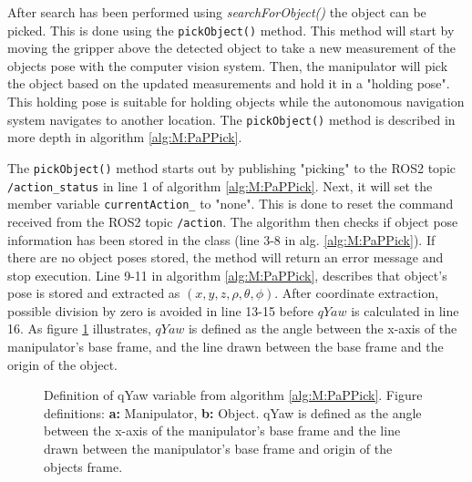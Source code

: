 


After search has been performed using \textit{searchForObject()} the object can be picked. This is done using the \lstinline{pickObject()}  method. This method will start by moving the gripper above the detected object to take a new measurement of the objects pose with the computer vision system. Then, the manipulator will pick the object based on the updated measurements and hold it in a "holding pose". This holding pose is suitable for holding objects while the autonomous navigation system navigates to another location. The \lstinline{pickObject()}  method is described in more depth in algorithm \ref{alg:M:PaPPick}. 



The \lstinline{pickObject()} method starts out by publishing "picking" to the ROS2 topic \lstinline{/action_status} in line 1 of algorithm \ref{alg:M:PaPPick}. Next, it will set the member variable \lstinline{currentAction_} to "none". This is done to reset the command received from the ROS2 topic \lstinline{/action}. The algorithm then checks if object pose information has been stored in the class (line 3-8 in alg. \ref{alg:M:PaPPick}). If there are no object poses stored, the method will return an error message and stop execution. Line 9-11 in algorithm \ref{alg:M:PaPPick}, describes that object's pose is stored and extracted as $(x,y,z,\rho,\theta,\phi)$. After coordinate extraction, possible division by zero is avoided in line 13-15 before $qYaw$ is calculated in line 16. As figure \ref{fig:M:PAP:M:qYaw} illustrates, $qYaw$ is defined as the angle between the x-axis of the manipulator's base frame, and the line drawn between the base frame and the origin of the object.

\begin{figure}[htp!]
  \fontsize{14}{14}\selectfont
  \centering
  
  \caption{Definition of qYaw variable from algorithm \ref{alg:M:PaPPick}. Figure definitions: \textbf{a:} Manipulator, \textbf{b:} Object. qYaw is defined as the angle between the x-axis of the manipulator's base frame and the line drawn between the manipulator's base frame and origin of the objects frame.}
  \label{fig:M:PAP:M:qYaw}
\end{figure}

